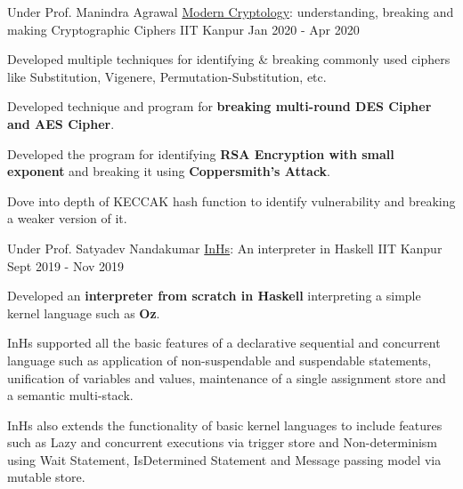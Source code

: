 \begin{cventries}


  \cventry
    {Under Prof. Manindra Agrawal} %
    {\href{https://github.com/ayush268/Crypto_Game}{Modern Cryptology}: understanding, breaking and making Cryptographic Ciphers} %
    {IIT Kanpur} %
    {Jan 2020 - Apr 2020} %
    {
      \begin{cvitems} %
      \item {Developed multiple techniques for identifying \& breaking commonly used ciphers like Substitution, Vigenere, Permutation-Substitution, etc.}
      \item {Developed technique and program for \textbf{breaking multi-round DES Cipher and AES Cipher}.}
      \item {Developed the program for identifying \textbf{RSA Encryption with small exponent} and breaking it using \textbf{Coppersmith’s Attack}.}
      \item {Dove into depth of KECCAK hash function to identify vulnerability and breaking a weaker version of it.}
      \end{cvitems}
    }


  \cventry
    {Under Prof. Satyadev Nandakumar} %
    {\href{https://github.com/ayush268/InHs}{InHs}: An interpreter in Haskell} %
    {IIT Kanpur} %
    {Sept 2019 - Nov 2019} %
    {
      \begin{cvitems} %
      \item {Developed an \textbf{interpreter from scratch in Haskell} interpreting a simple kernel language such as \textbf{Oz}.}
      \item {InHs supported all the basic features of a declarative sequential and concurrent language such as application of non-suspendable and suspendable statements, unification of variables and values, maintenance of a single assignment store and a semantic multi-stack.}
      \item {InHs also extends the functionality of basic kernel languages to include features such as Lazy and concurrent executions via trigger store and Non-determinism using Wait Statement, IsDetermined Statement and Message passing model via mutable store.}
      \end{cvitems}
    }%


\end{cventries}
